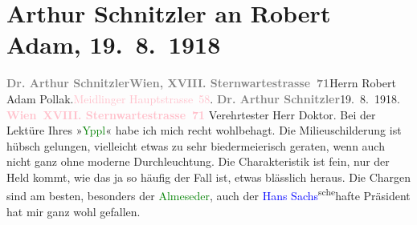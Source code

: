 

               \section[Arthur Schnitzler an Robert Adam, 19. 8. 1918]{ Arthur Schnitzler an Robert Adam, 19. 8. 1918}\nopagebreak{}\rehead{ }\normalsize\beginnumbering{} \toendnotes[C]{\smallbreak\pagebreak[2]} 
\toendnotes[C]{\smallbreak}\pstart{}{\pb}\textcolor{gray}{\textbf{Dr. Arthur Schnitzler}}\pend{}\pstart{}\textcolor{pink}{\textcolor{gray}{\textbf{Wien, XVIII. Sternwartestrasse 71}}}{}\ledrightnote{\textcolor{pink}{Sternwartestraße}}\pend{}{\bigskip}\pstart{}{\pb}Herrn Robert Adam Pollak\pend{}\pstart{}\textcolor{pink}{}{}\ledrightnote{\textcolor{pink}{XII., Meidling}}.\pend{}\pstart{}\textcolor{pink}{Meidlinger Hauptstrasse 58}{}\ledrightnote{\textcolor{pink}{Meidlinger Hauptstraße}}.\pend{}{\bigskip}\pstart
           {\pb}\textcolor{gray}{\textbf{Dr. Arthur Schnitzler}}\hfill 19. 8. 1918.\pend
           \pstart
           \textcolor{gray}{\textbf{\textcolor{pink}{Wien XVIII. Sternwartestrasse 71}{}\ledrightnote{\textcolor{pink}{Sternwartestraße}}}}\pend
           \pstart\center{}Verehrtester Herr Doktor.\pend\pstart
           Bei der Lektüre Ihres »\textcolor{green}{Yppl}{}\ledrightnote{\textcolor{green}{Yppl. Idylle in fünf Akten}}« habe ich mich recht
               wohlbehagt. Die Milieuschilderung ist hübsch gelungen, vielleicht etwas zu sehr
               biedermeierisch geraten, wenn auch nicht ganz ohne moderne Durchleuchtung. Die
               Charakteristik ist fein, nur der Held kommt, wie das ja so häufig der Fall ist, etwas
               blässlich heraus. Die Chargen sind am besten, besonders der \textcolor{green}{Almeseder}{}, auch der \textcolor{blue}{Hans Sachs}{}\ledrightnote{\textcolor{blue}{Hans Sachs}}\substVorne{}\textsuperscript{sche}\substDazwischen{}hafte\substHinten{} Präsident hat mir ganz wohl gefallen.\pend

